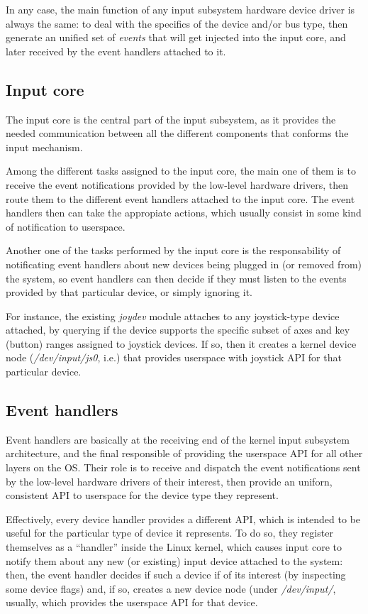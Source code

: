 In any case, the main function of any input subsystem hardware device driver is always the same: to deal with the specifics of the device and/or bus type, then generate an unified set of \emph{events} that will get injected into the input core, and later received by the event handlers attached to it.

\subsection{Input core}
The input core is the central part of the input subsystem, as it provides the needed communication between all the different components that conforms the input mechanism. 

Among the different tasks assigned to the input core, the main one of them is to receive the event notifications provided by the low-level hardware drivers, then route them to the different event handlers attached to the input core. The event handlers then can take the appropiate actions, which usually consist in some kind of notification to userspace.

Another one of the tasks performed by the input core is the responsability of notificating event handlers about new devices being plugged in (or removed from) the system, so event handlers can then decide if they must listen to the events provided by that particular device, or simply ignoring it. 

For instance, the existing \emph{joydev} module attaches to any joystick-type device attached, by querying if the device supports the specific subset of axes and key (button) ranges assigned to joystick devices. If so, then it creates a kernel device node (\emph{/dev/input/js0}, i.e.) that provides userspace with joystick API for that particular device.

\subsection{Event handlers}
Event handlers are basically at the receiving end of the kernel input subsystem architecture, and the final responsible of providing the userspace API for all other layers on the OS. Their role is to receive and dispatch the event notifications sent by the low-level hardware drivers of their interest, then provide an uniforn, consistent API to userspace for the device type they represent.

Effectively, every device handler provides a different API, which is intended to be useful for the particular type of device it represents. To do so, they register themselves as a ``handler'' inside the Linux kernel, which causes input core to notify them about any new (or existing) input device attached to the system: then, the event handler decides if such a device if of its interest (by inspecting some device flags) and, if so, creates a new device node (under \emph{/dev/input/}, usually, which provides the userspace API for that device.

